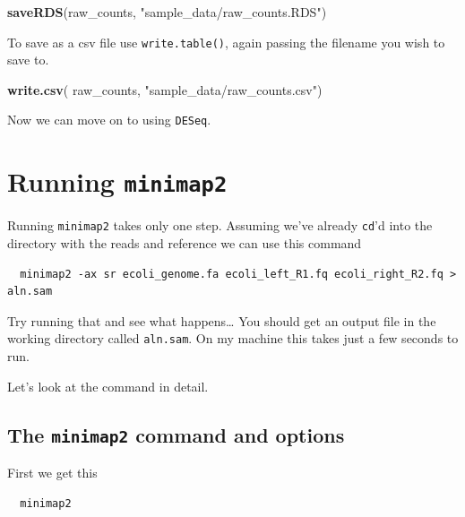 \documentclass[]{book}
\newenvironment{Shaded}{\begin{snugshade}}{\end{snugshade}}
\newcommand{\KeywordTok}[1]{\textcolor[rgb]{0.13,0.29,0.53}{\textbf{#1}}}
\newcommand{\NormalTok}[1]{#1}
\newcommand{\StringTok}[1]{\textcolor[rgb]{0.31,0.60,0.02}{#1}}
\begin{document}
\begin{Shaded}
\begin{Highlighting}[]
\KeywordTok{saveRDS}\NormalTok{(raw_counts, }\StringTok{"sample_data/raw_counts.RDS"}\NormalTok{)}
\end{Highlighting}
\end{Shaded}

To save as a csv file use \texttt{write.table()}, again passing the filename you wish to save to.

\begin{Shaded}
\begin{Highlighting}[]
\KeywordTok{write.csv}\NormalTok{( raw_counts, }\StringTok{"sample_data/raw_counts.csv"}\NormalTok{)}
\end{Highlighting}
\end{Shaded}

Now we can move on to using \texttt{DESeq}.

\hypertarget{running-minimap2}{%
\chapter{\texorpdfstring{Running \texttt{minimap2}}{Running minimap2}}\label{running-minimap2}}

Running \texttt{minimap2} takes only one step. Assuming we've already \texttt{cd}'d into the directory with the reads and reference we can use this command

\begin{verbatim}
  minimap2 -ax sr ecoli_genome.fa ecoli_left_R1.fq ecoli_right_R2.fq > aln.sam
\end{verbatim}

Try running that and see what happens\ldots{} You should get an output file in the working directory called \texttt{aln.sam}. On my machine this takes just a few seconds to run.

Let's look at the command in detail.

\hypertarget{the-minimap2-command-and-options}{%
\section{\texorpdfstring{The \texttt{minimap2} command and options}{The minimap2 command and options}}\label{the-minimap2-command-and-options}}

First we get this

\begin{verbatim}
  minimap2
\end{verbatim}
\end{document}
